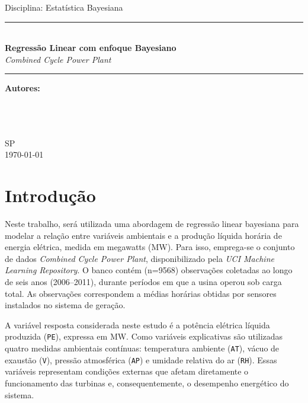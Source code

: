 \documentclass[12pt, a4paper]{article}
\begin{document}
\begin{titlepage}
  \centering
  \vspace*{1cm}

  {\large Disciplina: Estatística Bayesiana}

  \vspace{2.5cm}

  \rule{\linewidth}{0.5pt}\\[0.4cm]
  {\LARGE \textbf{Regressão Linear com enfoque Bayesiano}\\[0.3cm]
  \large \textit{Combined Cycle Power Plant}}

  \rule{\linewidth}{0.5pt}

  \vspace{2cm}

  {\large \textbf{Autores:}}\\[0.3cm]
  {\large }\\[0.2cm]
  {\large }\\[0.2cm]
  {\large }\\[0.3cm]

  \vfill

  {\large SP}\\[0.2cm]
  {\large \today}
\end{titlepage}


\tableofcontents
\newpage

\section*{Introdução}

Neste trabalho, será utilizada uma abordagem de regressão linear bayesiana para modelar a relação entre variáveis ambientais e a produção líquida horária de energia elétrica, medida em megawatts (MW). Para isso, emprega-se o conjunto de dados \textit{Combined Cycle Power Plant}, disponibilizado pela \textit{UCI Machine Learning Repository}. O banco contém (n=9568) observações coletadas ao longo de seis anos (2006--2011), durante períodos em que a usina operou sob carga total. As observações correspondem a médias horárias obtidas por sensores instalados no sistema de geração.

A variável resposta considerada neste estudo é a potência elétrica líquida produzida (\texttt{PE}), expressa em MW. Como variáveis explicativas são utilizadas quatro medidas ambientais contínuas: temperatura ambiente (\texttt{AT}), vácuo de exaustão (\texttt{V}), pressão atmosférica (\texttt{AP}) e umidade relativa do ar (\texttt{RH}). Essas variáveis representam condições externas que afetam diretamente o funcionamento das turbinas e, consequentemente, o desempenho energético do sistema.
\end{document}
